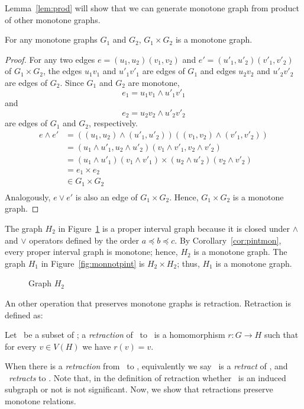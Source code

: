 Lemma~\ref{lem:prod} will show that we can generate monotone graph from product of other
monotone graphs.

\begin{lemma}\label{lem:prod}
For any monotone graphs \(G_1\) and \(G_2\), \(G_1 \times G_2\) is a monotone graph.
\end{lemma}

\begin{proof}
For any two edges \(e = (u_1,u_2)(v_1,v_2)\) and \(e' =(u'_1,u'_2)(v'_1,v'_2)\) of \(G_1\times G_2\),
the edges \(u_1v_1\) and \(u'_1v'_1\) are edges of \(G_1\) and
edges \(u_2v_2\) and \(u'_2v'_2\) are edges of \(G_2\)\@.
Since \(G_1\) and \(G_2\) are monotone,
\[e_1 = u_1v_1 \wedge u'_1v'_1\]
and
\[e_2 = u_2v_2 \wedge u'_2v'_2\]
are edges of \(G_1\) and \(G_2\), respectively.
\begin{align*}
e \wedge e' &= ((u_1,u_2)\wedge(u'_1,u'_2))((v_1,v_2)\wedge(v'_1,v'_2)) \\
&= (u_1\wedge u'_1,u_2 \wedge u'_2)(v_1\wedge v'_1,v_2 \wedge v'_2) \\
&= (u_1\wedge u'_1)(v_1\wedge v'_1) \times (u_2\wedge u'_2)(v_2\wedge v'_2) \\
&= e_1 \times e_2 \\
&\in G_1 \times G_2 \\
\end{align*}
Analogously, \(e \vee e'\) is also an edge of \(G_1\times G_2\)\@. Hence, \(G_1\times G_2\)
is a monotone graph.
\end{proof}

\begin{example}\label{exm:prod}
The graph \(H_2\) in Figure~\ref{fig:pint2} is a proper interval graph because it is
closed under \(\wedge\) and \(\vee\) operators defined by the order \(a \preceq b \preceq c\)\@.
By Corollary~\ref{cor:pintmon}, every proper interval graph is monotone; hence, \(H_2\) is a monotone graph.
The graph \(H_1\) in Figure~\ref{fig:monnotpint} is \(H_2\times H_2\); thus, \(H_1\) is a monotone graph.
\begin{figure}
\center

\caption{Graph \ensuremath{H_2}}\label{fig:pint2}
\end{figure}
\end{example}

An other operation that preserves monotone graphs is retraction. Retraction is defined as:

\begin{defi} [Retraction]
Let \mH\ be a subset of \mG; a \emph{retraction} of \mG\ to \mH\ is a 
homomorphism \(r: G\to H\) such that for every \(v\in V(H)\) we have
\(r(v) = v\)\@.
\end{defi}
When there is a \emph{retraction} from \mH\ to \mG, equivalently we say
\mH\ is a \emph{retract} of \mG, and \mG\ \emph{retracts} to \mH\@.
Note that, in the definition of retraction whether \mH\ is an induced subgraph or not 
is not significant. Now, we show that retractions preserve monotone relations.

